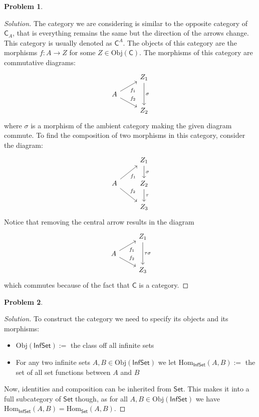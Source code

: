 \documentclass{article}
\theoremstyle{definition}
\newtheorem{problem-internal}{Problem}[subsection]
\newenvironment{problem}{
	\medskip
	\begin{problem-internal}
	}{
\end{problem-internal}
}
\newenvironment{solution}{
	\begin{proof}[Solution]
		\vspace{-8px}
		\setlength{\parskip}{4px}
		\setlength{\parindent}{0px}
	}{
\end{proof}
}
\newcommand{\Obj}{\mathrm{Obj}}
\newcommand{\Hom}{\mathrm{Hom}}
\newcommand{\C}{\mathsf{C}}
\begin{document}
\begin{problem}
\end{problem}

\begin{solution}
	The category we are considering is similar to the opposite category of $\C_A$, that is everything remains the same but the direction of the arrows change. This category is usually denoted as $\C^A$. The objects of this category are the morphisms $f : A \to Z$ for some $Z \in \Obj(\C)$. The morphisms of this category are commutative diagrams:
	\begin{equation*}
		\begin{tikzcd}[row sep=small]
			& Z_1 \arrow[dd, "\sigma"]\\
			A \arrow[ur, "f_1" swap]
			  \arrow[dr, "f_2"] & {} \\
			& Z_2
		\end{tikzcd}
	\end{equation*}
	where $\sigma$ is a morphism of the ambient category making the given diagram commute. To find the composition of two morphisms in this category, consider the diagram:
	\begin{equation*}
		\begin{tikzcd}
			& Z_1 \arrow[d, "\sigma"]\\
			A \arrow[ur, "f_1" swap]
			  \arrow[dr, "f_2"] & Z_2 \arrow[d, "\tau"] \\
			& Z_3
		\end{tikzcd}
	\end{equation*}
	Notice that removing the central arrow results in the diagram
	\begin{equation*}
		\begin{tikzcd}[row sep=small]
			& Z_1 \arrow[dd, "\tau\sigma"]\\
			A \arrow[ur, "f_1" swap]
			  \arrow[dr, "f_2"] & {} \\
			& Z_3
		\end{tikzcd}
	\end{equation*}
	which commutes because of the fact that $\C$ is a category.
\end{solution}

\begin{problem}
\end{problem}

\begin{solution}
	To construct the category we need to specify its objects and its morphisms:
	\begin{itemize}
		\item $\Obj(\mathsf{InfSet}) := $ the class off all infinite sets
		\item For any two infinite sets $A, B \in \Obj(\mathsf{InfSet})$ we let $\Hom_{\mathsf{InfSet}}(A,B) := $ the set of all set functions between $A$ and $B$
	\end{itemize}
	Now, identities and composition can be inherited from $\mathsf{Set}$. This makes it into a full subcategory of $\mathsf{Set}$ though, as for all $A, B \in \Obj(\mathsf{InfSet})$ we have $\Hom_{\mathsf{InfSet}}(A,B) = \Hom_{\mathsf{Set}}(A,B)$.
\end{solution}
\end{document}
